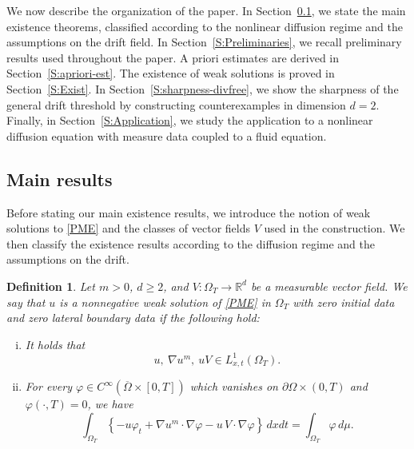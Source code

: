 \documentclass{amsart}
\newtheorem{definition}[defn]{Definition}
\numberwithin{equation}{section}
\begin{document}
We now describe the organization of the paper. In Section~\ref{S: Main}, we state the main existence theorems, classified according to the nonlinear diffusion regime and the assumptions on the drift field. In Section~\ref{S:Preliminaries}, we recall preliminary results used throughout the paper. A priori estimates are derived in Section~\ref{S:apriori-est}. The existence of weak solutions is proved in Section~\ref{S:Exist}. In Section~\ref{S:sharpness-divfree}, we show the sharpness of the general drift threshold by constructing counterexamples in dimension \(d=2\). Finally, in Section~\ref{S:Application}, we study the application to a nonlinear diffusion equation with measure data coupled to a fluid equation.





\subsection{Main results}\label{S: Main}

Before stating our main existence results, we introduce the notion of weak solutions to \eqref{PME} and the classes of vector fields $V$ used in the construction. We then classify the existence results according to the diffusion regime and the assumptions on the drift.


\begin{definition}\label{D:WS}
Let $m>0$, $d\geq 2$, and $V:\Omega_{T} \to \mathbb{R}^d$ be a measurable vector field. We say that $u$ is a nonnegative weak solution of \eqref{PME} in $\Omega_{T}$ with zero initial data and zero lateral boundary data if the following hold:
\begin{enumerate}[(i)]
  \item It holds that
	\[
	u,\ \nabla u^m,\ uV \in L_{x,t}^{1}(\Omega_T).
	\]
  \item For every $\varphi \in C^{\infty} \left(\overline{\Omega} \times [0, T]\right)$ which vanishes on $\partial \Omega \times (0,T)$ and $\varphi(\cdot,T)=0$, we have
	\[
	\int_{\Omega_{T}} \left\{ - u \varphi_t + \nabla u^m \cdot\nabla \varphi - u \, V\cdot \nabla \varphi \right\} \,dxdt = \int_{\Omega_{T}} \varphi \,d\mu.
\]
\end{enumerate}
\end{definition}
\end{document}
